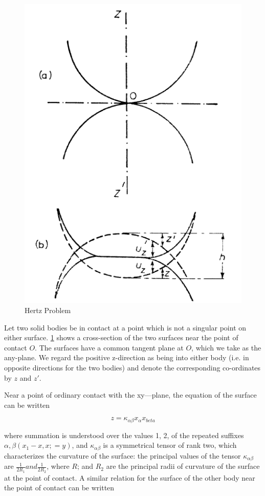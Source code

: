 \begin{figure}[H]
\includegraphics[scale=0.5]{../images/Intro/hertz.png}
\caption{Hertz Problem}
\label{fig:hertzfigure}
\end{figure}

Let two solid bodies be in contact at a point which is not a singular point on either surface. \ref{fig:hertzfigure} shows a cross-section of the two surfaces near the point of contact $O$. The surfaces have a common tangent plane at $O$, which we take as the any-plane. We regard the positive z-direction as being into either body (i.e. in opposite directions for the two bodies) and denote the corresponding co-ordinates by $z$ and $z'$.

Near a point of ordinary contact with the xy—plane, the equation of the surface can be written

\begin{equation}
z = \kappa_{\alpha\beta}x_{\alpha}x_{beta}
\label{eq:contacteq1}
\end{equation}

where summation is understood over the values 1, 2, of the repeated suffixes $\alpha, \beta (x_{1} - x, x; = y)$, and $\kappa_{\alpha\beta}$ is a symmetrical tensor of rank two, which characterizes the curvature of the surface: the principal values of the tensor $\kappa_{\alpha\beta}$ are $\frac{1}{2R_{1}} and \frac{1}{2R_{2}}$, where $R$; and $R_{2}$ are the principal radii of curvature
of the surface at the point of contact. A similar relation for the surface of the other body near the point of contact can be written

